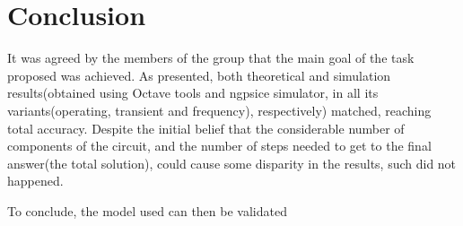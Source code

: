 \pagebreak
\section{Conclusion}
\label{conclusion}

\par It was agreed by the members of the group that the main goal of the task proposed was achieved. As presented, both theoretical and simulation results(obtained using Octave tools and ngpsice simulator, in all its variants(operating, transient and frequency), respectively) matched, reaching total accuracy. Despite the initial belief that the considerable number of components of the circuit, and the number of steps needed to get to the final answer(the total solution),  could cause some disparity in the results, such did not happened.
\par To conclude, the model used can then be validated
